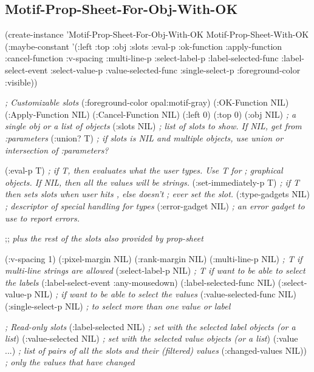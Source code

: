 \begin{group}
\subsection{Motif-Prop-Sheet-For-Obj-With-OK}
\label{motif-prop-sheet-for-obj-with-ok}

\begin{programexample}
(create-instance 'Motif-Prop-Sheet-For-Obj-With-OK Motif-Prop-Sheet-With-OK
    (:maybe-constant '(:left :top :obj :slots :eval-p :ok-function :apply-function
                       :cancel-function :v-spacing :multi-line-p :select-label-p
		       :label-selected-func :label-select-event :select-value-p
                       :value-selected-func :single-select-p :foreground-color :visible))

   {\it ; Customizable slots}
    (:foreground-color opal:motif-gray)
    (:OK-Function NIL)
    (:Apply-Function NIL)
    (:Cancel-Function NIL)
    (:left 0) (:top 0)
    (:obj NIL)   {\it ; a single obj or a list of objects}
    (:slots NIL) {\it ; list of slots to show. If NIL, get from :parameters}
    (:union? T)  {\it ; if slots is NIL and multiple objects, use union or intersection of :parameters?}

    (:eval-p T)  {\it ; if T, then evaluates what the user types.  Use T for}
		 {\it ; graphical objects.  If NIL, then all the values will be strings.}
    (:set-immediately-p T) {\it ; if T then sets slots when user hits , else doesn't}
			   {\it ; ever set the slot.}
    (:type-gadgets NIL)  {\it ; descriptor of special handling for types}
    (:error-gadget NIL)  {\it ; an error gadget to use to report errors.}

    ;; {\it plus the rest of the slots also provided by prop-sheet}

    (:v-spacing 1)
    (:pixel-margin NIL)
    (:rank-margin NIL)
    (:multi-line-p NIL) {\it ; T if multi-line strings are allowed}
    (:select-label-p NIL) {\it ; T if want to be able to select the labels}
    (:label-select-event :any-mousedown)
    (:label-selected-func NIL)
    (:select-value-p NIL) {\it ; if want to be able to select the values}
    (:value-selected-func NIL)
    (:single-select-p NIL) {\it ; to select more than one value or label}

   {\it ; Read-only slots}
    (:label-selected NIL) {\it ; set with the selected label objects (or a list})
    (:value-selected NIL) {\it ; set with the selected value objects (or a list})
    (:value ...)  {\it ; list of pairs of all the slots and their (filtered) values}
    (:changed-values NIL)) {\it ; only the values that have changed}
\end{programexample}
\end{group}

